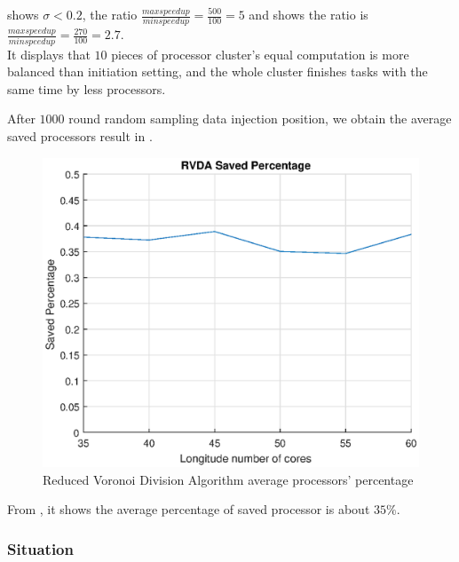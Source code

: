  shows $\sigma < 0.2$, the ratio $\frac{max speedup}{min speedup} = \frac{500}{100} = 5$ and  shows the ratio is $\frac{max speedup}{min speedup} = \frac{270}{100} = 2.7$.  \\
It displays that $10$ pieces of processor cluster's equal computation is more balanced than initiation setting, and the whole cluster finishes tasks with the same time by less processors.

\newpage
After $1000$ round random sampling data injection position, we obtain the average saved processors result in .

\begin{figure}[!ht]
\centering
\includegraphics[width=1\columnwidth]{figure/voronoi_save.eps}
\caption{Reduced Voronoi Division Algorithm average processors' percentage}
\label{fig:voronoi_save}
\end{figure}

From , it shows the average percentage of saved processor is about $35 \%$.
\newpage

\newpage
\subsubsection{Situation \uppercase\expandafter{}}
